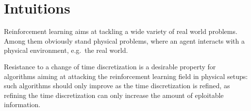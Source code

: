 
\section{Intuitions}
\label{sec:intuitions}
Reinforcement learning aims at tackling a wide variety of real world problems.
Among them obviously stand physical problems, where an agent interacts with a
physical environment, e.g.\ the real world.

Resistance to a change of time discretization is a desirable property for
algorithms aiming at attacking the reinforcement learning field in physical
setups: such algorithms should only improve as the time discretization is
refined, as refining the time discretization can only increase the amount of 
eploitable information.
